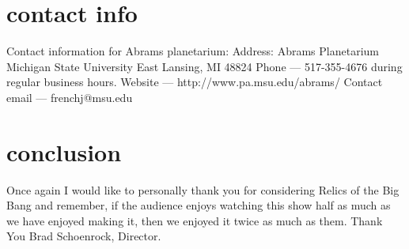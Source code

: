 \documentclass{article}
\begin{document}
\section{contact info}
Contact information for Abrams planetarium:
\newline
\newline
Address:
\newline
Abrams Planetarium
\newline
Michigan State University
\newline
East Lansing, MI 48824
\newline
\newline
Phone --- 517-355-4676 during regular business hours.
\newline
\newline
Website --- http://www.pa.msu.edu/abrams/
\newline
\newline
Contact email --- frenchj@msu.edu
\section{conclusion}
Once again I would like to personally thank you for considering Relics of the Big Bang and remember, if the audience enjoys watching this show half as much as we have enjoyed making it, then we enjoyed it twice as much as them. 
\newline
\newline
Thank You
\newline
\newline
Brad Schoenrock, Director. 
\end{document}
